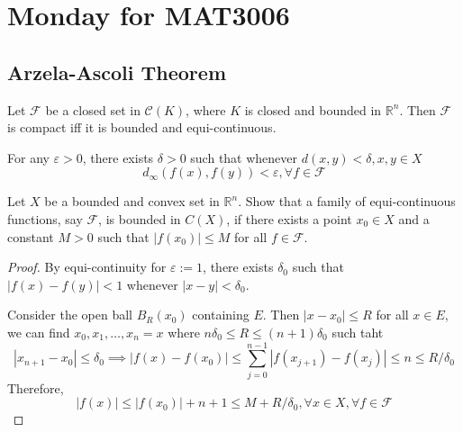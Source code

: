 \section{Monday for MAT3006}

\subsection{Arzela-Ascoli Theorem}
\begin{theorem}
Let $\mathcal{F}$ be a closed set in $\mathcal{C}(K)$, where $K$ is closed and bounded in $\mathbb{R}^n$.
Then $\mathcal{F}$ is compact iff it is bounded and equi-continuous.
\end{theorem}
\begin{definition}
For any $\varepsilon>0$, there exists $\delta>0$ such that whenever $d(x,y)<\delta, x,y\in X$
\[
d_\infty(f(x),f(y))<\varepsilon,\forall f\in\mathcal{F}
\]
\end{definition}
\begin{example}
Let $X$ be a bounded and convex set in $\mathbb{R}^n$.
Show that a family of equi-continuous functions, say $\mathcal{F}$,
is bounded in $C(X)$,
if there exists a point $x_0\in X$ and a constant $M>0$ such that $|f(x_0)|\le M$ for all $f\in\mathcal{F}$.
\begin{proof}
By equi-continuity for $\varepsilon:=1$, there exists $\delta_0$ such that $|f(x)-f(y)|<1$ whenever $|x-y|<\delta_0$.

Consider the open ball $B_{R}(x_0)$ containing $E$.
Then $|x-x_0|\le R$ for all $x\in E$, we can find $x_0,x_1,\dots,x_n=x$ where $n\delta_0\le R\le (n+1)\delta_0$ such taht
\[
|x_{n+1} - x_0|\le \delta_0\implies
|f(x)-f(x_0)|\le \sum_{j=0}^{n-1}|f(x_{j+1}) - f(x_j)|\le n\le R/\delta_0
\]
Therefore,
\[
|f(x)|\le |f(x_0)|+n+1\le M+R/\delta_0,\forall x\in X,\forall f\in\mathcal{F}
\]
\end{proof}
\end{example}

